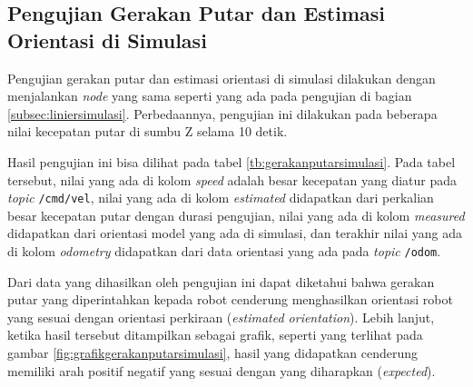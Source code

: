 \subsection{Pengujian Gerakan Putar dan Estimasi Orientasi di Simulasi}
\label{subsec:putarsimulasi}

Pengujian gerakan putar dan estimasi orientasi di simulasi dilakukan dengan menjalankan \emph{node} yang sama seperti yang ada pada pengujian di bagian \ref{subsec:liniersimulasi}.
Perbedaannya, pengujian ini dilakukan pada beberapa nilai kecepatan putar di sumbu Z selama 10 detik.

Hasil pengujian ini bisa dilihat pada tabel \ref{tb:gerakanputarsimulasi}.
Pada tabel tersebut, nilai yang ada di kolom \emph{speed} adalah besar kecepatan yang diatur pada \emph{topic} \lstinline{/cmd/vel},
  nilai yang ada di kolom \emph{estimated} didapatkan dari perkalian besar kecepatan putar dengan durasi pengujian,
  nilai yang ada di kolom \emph{measured} didapatkan dari orientasi model yang ada di simulasi,
  dan terakhir nilai yang ada di kolom \emph{odometry} didapatkan dari data orientasi yang ada pada \emph{topic} \lstinline{/odom}.



Dari data yang dihasilkan oleh pengujian ini dapat diketahui bahwa gerakan putar yang diperintahkan kepada robot cenderung menghasilkan orientasi robot yang sesuai dengan orientasi perkiraan (\emph{estimated orientation}).
Lebih lanjut, ketika hasil tersebut ditampilkan sebagai grafik,
  seperti yang terlihat pada gambar \ref{fig:grafikgerakanputarsimulasi},
  hasil yang didapatkan cenderung memiliki arah positif negatif yang sesuai dengan yang diharapkan (\emph{expected}).


